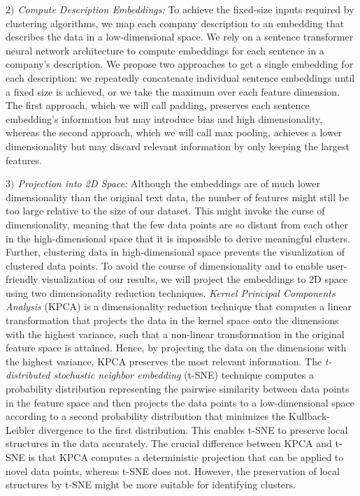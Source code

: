 \documentclass[conference]{IEEEtran}
\begin{document}
\textit{$2)$ Compute Description Embeddings:} To achieve the fixed-size inputs required by clustering algorithms, we map each company description to an embedding that describes the data in a low-dimensional space. We rely on a sentence transformer neural network architecture to compute embeddings for each sentence in a company's description. We propose two approaches to get a single embedding for each description: we repeatedly concatenate individual sentence embeddings until a fixed size is achieved, or we take the maximum over each feature dimension. The first approach, which we will call padding, preserves each sentence embedding's information but may introduce bias and high dimensionality, whereas the second approach, which we will call max pooling, achieves a lower dimensionality but may discard relevant information by only keeping the largest features.

\textit{$3)$ Projection into 2D Space:} Although the embeddings are of much lower dimensionality than the original text data, the number of features might still be too large relative to the size of our dataset. This might invoke the curse of dimensionality, meaning that the few data points are so distant from each other in the high-dimensional space that it is impossible to derive meaningful clusters. Further, clustering data in high-dimensional space prevents the visualization of clustered data points. To avoid the course of dimensionality and to enable user-friendly visualization of our results, we will project the embeddings to 2D space using two dimensionality reduction techniques.
\emph{Kernel Principal Components Analysis} (KPCA) is a dimensionality reduction technique that computes a linear transformation that projects the data in the kernel space onto the dimensions with the highest variance, such that a non-linear transformation in the original feature space is attained. Hence, by projecting the data on the dimensions with the highest variance, KPCA preserves the most relevant information.
The \emph{t-distributed stochastic neighbor embedding} (t-SNE) technique computes a probability distribution representing the pairwise similarity between data points in the feature space and then projects the data points to a low-dimensional space according to a second probability distribution that minimizes the Kullback-Leibler divergence to the first distribution. This enables t-SNE to preserve local structures in the data accurately.
The crucial difference between KPCA and t-SNE is that KPCA computes a deterministic projection that can be applied to novel data points, whereas t-SNE does not. However, the preservation of local structures by t-SNE might be more suitable for identifying clusters.
\end{document}

